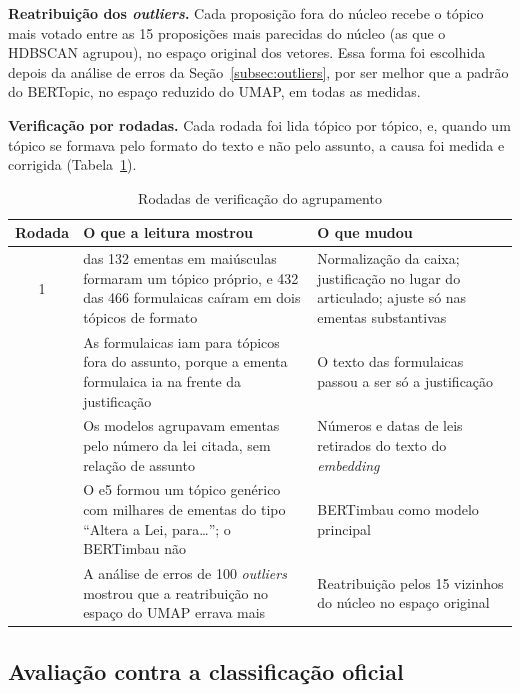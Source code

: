 \textbf{Reatribuição dos \textit{outliers}.} Cada proposição fora do núcleo recebe o tópico mais votado entre as 15 proposições mais parecidas do núcleo (as que o HDBSCAN agrupou), no espaço original dos vetores. Essa forma foi escolhida depois da análise de erros da Seção~\ref{subsec:outliers}, por ser melhor que a padrão do BERTopic, no espaço reduzido do UMAP, em todas as medidas.

\textbf{Verificação por rodadas.} Cada rodada foi lida tópico por tópico, e, quando um tópico se formava pelo formato do texto e não pelo assunto, a causa foi medida e corrigida (Tabela~\ref{tab:rodadas}).

\begin{table}[H]
\centering
\caption{Rodadas de verificação do agrupamento}
\label{tab:rodadas}
\small
\begin{tabularx}{\textwidth}{c >{\raggedright\arraybackslash}X >{\raggedright\arraybackslash}X}
\toprule
\textbf{Rodada} & \textbf{O que a leitura mostrou} & \textbf{O que mudou} \\
\midrule
1 & 128 das 132 ementas em maiúsculas formaram um tópico próprio, e 432 das 466 formulaicas caíram em dois tópicos de formato & Normalização da caixa; justificação no lugar do articulado; ajuste só nas ementas substantivas \\
\addlinespace
2 & As formulaicas iam para tópicos fora do assunto, porque a ementa formulaica ia na frente da justificação & O texto das formulaicas passou a ser só a justificação \\
\addlinespace
3 & Os modelos agrupavam ementas pelo número da lei citada, sem relação de assunto & Números e datas de leis retirados do texto do \textit{embedding} \\
\addlinespace
4 & O e5 formou um tópico genérico com milhares de ementas do tipo ``Altera a Lei, para\ldots''; o BERTimbau não & BERTimbau como modelo principal \\
\addlinespace
5 & A análise de erros de 100 \textit{outliers} mostrou que a reatribuição no espaço do UMAP errava mais & Reatribuição pelos 15 vizinhos do núcleo no espaço original \\
\bottomrule
\end{tabularx}
\end{table}

\subsection{Avaliação contra a classificação oficial}
\label{subsec:avaliacao}

